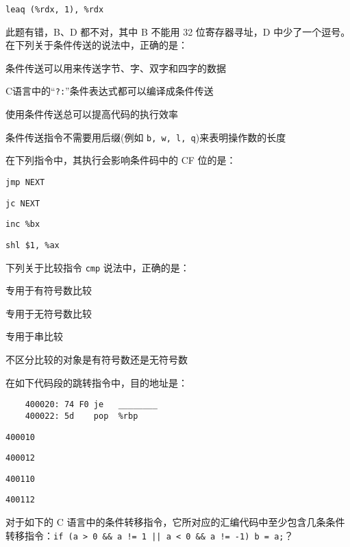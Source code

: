 \begin{problems}
\begin{choices}
            \item \verb|leaq (%rdx, 1), %rdx|
        \end{choices}
        \sol 此题有错，B、D 都不对，其中 B 不能用 32 位寄存器寻址，D 中少了一个逗号。
         在下列关于条件传送的说法中，正确的是：
        \begin{choices}
            \item 条件传送可以用来传送字节、字、双字和四字的数据
            \item C语言中的“\verb|?:|”条件表达式都可以编译成条件传送
            \item 使用条件传送总可以提高代码的执行效率
            \item 条件传送指令不需要用后缀(例如 \verb|b, w, l, q|)来表明操作数的长度
        \end{choices}
         在下列指令中，其执行会影响条件码中的 CF 位的是：
        \begin{choices}
            \item \verb|jmp NEXT|
            \item \verb|jc NEXT|
            \item \verb|inc %bx|
            \item \verb|shl $1, %ax|
        \end{choices}
         下列关于比较指令 \verb|cmp| 说法中，正确的是：
        \begin{choices}
            \item 专用于有符号数比较
            \item 专用于无符号数比较
            \item 专用于串比较
            \item 不区分比较的对象是有符号数还是无符号数
        \end{choices}
         在如下代码段的跳转指令中，目的地址是：
        \begin{verbatim}
    400020: 74 F0 je   ________
    400022: 5d    pop  %rbp
        \end{verbatim}
        \begin{choices}
            \item \texttt{400010}
            \item \texttt{400012}
            \item \texttt{400110}
            \item \texttt{400112}
        \end{choices}
         对于如下的 C 语言中的条件转移指令，它所对应的汇编代码中至少包含几条条件转移指令：\verb+if (a > 0 && a != 1 || a < 0 && a != -1) b = a;+？

\end{problems}
